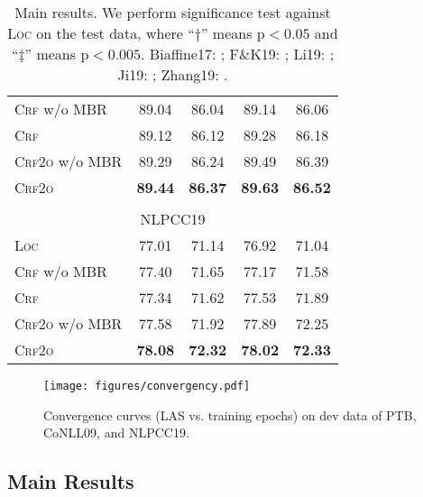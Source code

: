 \documentclass[11pt,a4paper]{article}
\begin{document}
\begin{table}[tb]
\begin{tabular}{lcccc}
\textsc{Crf} w/o MBR   &         89.04  &         86.04  &         89.14                    &         86.06 \\
\textsc{Crf}           &         89.12  &         86.12  &         89.28                    &         86.18\rlap{$^\dagger$} \\
\textsc{Crf2o} w/o MBR &         89.29  &         86.24  &         89.49                    &         86.39 \\
\textsc{Crf2o}         & \textbf{89.44} & \textbf{86.37} & \textbf{89.63}\rlap{$^\ddagger$} & \textbf{86.52}\rlap{$^\ddagger$} \\[2pt]
\hline
\\[-8pt]
\multicolumn{5}{c}{NLPCC19} \\
\textsc{Loc}           &         77.01  &         71.14  &         76.92                    &         71.04 \\
\textsc{Crf} w/o MBR   &         77.40  &         71.65  &         77.17                    &         71.58 \\
\textsc{Crf}           &         77.34  &         71.62  &         77.53\rlap{$^\ddagger$}  &         71.89\rlap{$^\ddagger$} \\
\textsc{Crf2o} w/o MBR &         77.58  &         71.92  &         77.89                    &         72.25 \\
\textsc{Crf2o}         & \textbf{78.08} & \textbf{72.32} & \textbf{78.02}\rlap{$^\ddagger$} & \textbf{72.33}\rlap{$^\ddagger$} \\
\bottomrule
\end{tabular}
\caption{Main results. We perform significance test against \textsc{Loc} on the test data, where ``$\dagger$'' means $\mathrm{p} < 0.05$ and ``$\ddagger$'' means $\mathrm{p} < 0.005$.
Biaffine17: \citet{Timothy-d17-biaffine}; F\&K19: \citet{falenska-kuhn-2019-non};
Li19: \citet{li-etal-2019-attentive}; Ji19: \citet{ji-etal-2019-graph};
Zhang19: \citet{zhang-etal-2019-empirical}.
}
\label{table:dev-test}
\end{table}


 
\begin{figure*}[tb]
\centering
\texttt{[image: figures/convergency.pdf]}
\caption{
    Convergence curves (LAS vs. training epochs) on dev data of PTB, CoNLL09, and NLPCC19.
}
\label{fig:convergency}
\end{figure*}

\subsection{Main Results}
\end{document}
